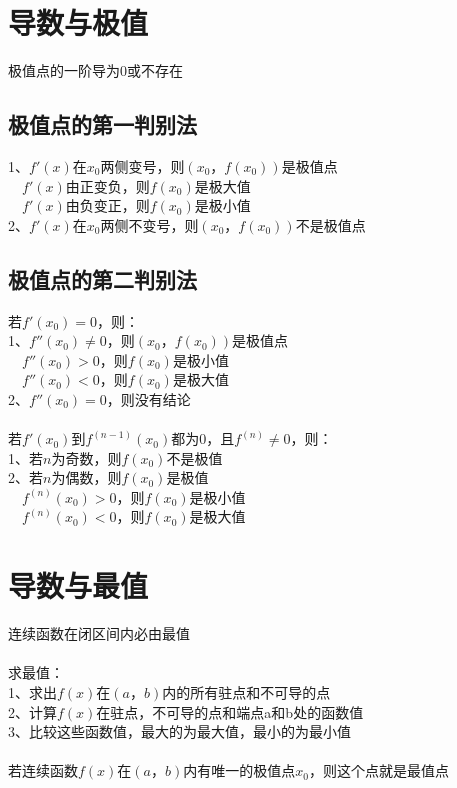 \documentclass{article}
\begin{document}
\begin{flushleft}
	\section{导数与极值}
	
	极值点的一阶导为0或不存在\\

	\subsection{极值点的第一判别法}
	1、$f'(x)$在$x_0$两侧变号，则$(x_0，f(x_0))$是极值点\\
	\ \ $f'(x)$由正变负，则$f(x_0)$是极大值\\
	\ \ $f'(x)$由负变正，则$f(x_0)$是极小值\\
	2、$f'(x)$在$x_0$两侧不变号，则$(x_0，f(x_0))$不是极值点\\

	\subsection{极值点的第二判别法}
	若$f'(x_0)=0$，则：\\
	1、$f''(x_0)\neq 0$，则$(x_0，f(x_0))$是极值点\\
	\ \ $f''(x_0)>0$，则$f(x_0)$是极小值\\
	\ \ $f''(x_0)<0$，则$f(x_0)$是极大值\\
	2、$f''(x_0)=0$，则没有结论\\
	~\\
	若$f'(x_0)$到$f^{(n-1)}(x_0)$都为0，且$f^{(n)}\neq 0$，则：\\
	1、若$n$为奇数，则$f(x_0)$不是极值\\
	2、若$n$为偶数，则$f(x_0)$是极值\\
	\ \ $f^{(n)}(x_0)>0$，则$f(x_0)$是极小值\\
	\ \ $f^{(n)}(x_0)<0$，则$f(x_0)$是极大值\\
	
	\section{导数与最值}
	
	连续函数在闭区间内必由最值\\
	~\\
	求最值：\\
	1、求出$f(x)$在$(a，b)$内的所有驻点和不可导的点\\
	2、计算$f(x)$在驻点，不可导的点和端点a和b处的函数值\\
	3、比较这些函数值，最大的为最大值，最小的为最小值\\
	~\\
	若连续函数$f(x)$在$(a，b)$内有唯一的极值点$x_0$，则这个点就是最值点\\
	

\end{flushleft}
\end{document}
